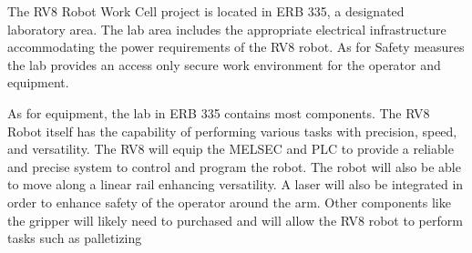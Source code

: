 The RV8 Robot Work Cell project is located in ERB 335, a designated laboratory area. The lab area includes the appropriate electrical infrastructure accommodating the power requirements of the RV8 robot. As for Safety measures the lab provides an access only secure work environment for the operator and equipment.


As for equipment, the lab in ERB 335 contains most components. The RV8 Robot itself has the capability of performing various tasks with precision, speed, and versatility. The RV8 will equip the MELSEC and PLC to provide a reliable and precise system to control and program the robot. The robot will also be able to move along a linear rail enhancing versatility. A laser will also be integrated in order to enhance safety of the operator around the arm. Other components like the gripper will likely need to purchased and will allow the RV8 robot to perform tasks such as palletizing 

